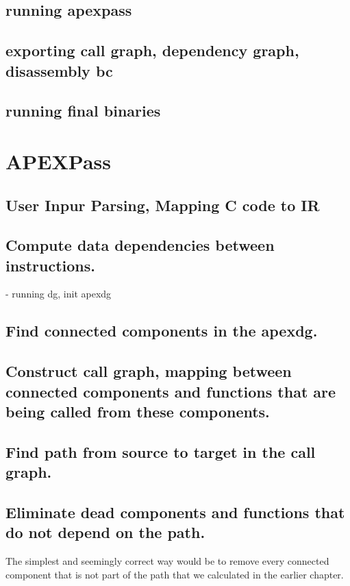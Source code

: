 \documentclass[12pt, twoside]{fithesis2}
\renewcommand{\_}{\leavevmode \kern0.07em\vbox{\hrule width0.4em}}
\begin{document}
\subsection{running apexpass}

\subsection{exporting call graph, dependency graph, disassembly bc}

\subsection{running final binaries}

\section{APEXPass}

\subsection{User Inpur Parsing, Mapping C code to IR}

\subsection{Compute data dependencies between instructions.}
- running dg, init apexdg

\subsection{Find connected components in the apexdg.}

\subsection{Construct call graph, mapping between connected components and functions
that are being called from these components.}

\subsection{Find path from source to target in the call graph.}

\subsection{Eliminate dead components and functions that do not depend on the path.}
The simplest and seemingly correct way would be to remove every connected
component that is not part of the path that we calculated in the earlier
chapter.
\end{document}
